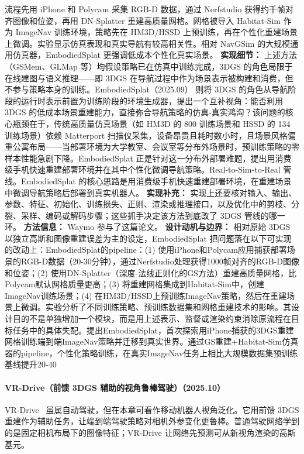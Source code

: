 流程先用 iPhone 和 Polycam 采集 RGB-D 数据，通过 Nerfstudio 获得约千帧对齐图像和位姿，再用 DN-Splatter 重建高质量网格。网格被导入 Habitat-Sim 作为 ImageNav 训练环境，策略先在 HM3D/HSSD 上预训练，再在个性化重建场景上微调。实验显示仿真表现和真实导航有较高相关性。相对 NavGSim 的大规模通用仿真器，EmbodiedSplat 更强调低成本个性化真实场景。
\textbf{实现细节：} 上述方法（GSMem、GLMap 等）均假设策略已在仿真中训练完成，3DGS 的角色局限于在线建图与语义推理——即 3DGS 在导航过程中作为场景表示被构建和消费，但不参与策略本身的训练。EmbodiedSplat（2025.09） 则将 3DGS 的角色从导航阶段的运行时表示前置为训练阶段的环境生成器，提出一个互补视角：能否利用 3DGS 的低成本场景重建能力，直接弥合导航策略的仿真-真实鸿沟？该问题的核心瓶颈在于，传统高质量仿真场景（如 HM3D 的 800 训练场景和 HSSD 的 134 训练场景）依赖 Matterport 扫描仪采集，设备昂贵且耗时数小时，且场景风格偏重公寓布局——当部署环境为大学教室、会议室等分布外场景时，预训练策略的零样本性能急剧下降。EmbodiedSplat 正是针对这一分布外部署难题，提出用消费级手机快速重建部署环境并在其中个性化微调导航策略。Real-to-Sim-to-Real 管线。EmbodiedSplat 的核心思路是用消费级手机快速重建部署环境，在重建场景中微调导航策略后部署到真实机器人。
\textbf{实现补充：} 实现上还要核对输入、输出、参数、特征、初始化、训练损失、正则、渲染或推理接口，以及优化中的剪枝、分裂、采样、编码或解码步骤；这些抓手决定该方法到底改了 3DGS 管线的哪一环。
\textbf{方法信息：} Waymo 参与了这篇论文。
\textbf{设计动机与边界：} 相对原始 3DGS 以独立高斯和图像重建误差为主的设定，EmbodiedSplat 把问题落在以下可实现的改动上：EmbodiedSplat的pipeline：(1) 使用iPhone和Polycam应用捕获部署场景的RGB-D数据（20-30分钟），通过Nerfstudio处理获得1000帧对齐的RGB-D图像和位姿；(2) 使用DN-Splatter（深度-法线正则化的GS方法）重建高质量网格，比Polycam默认网格质量更高；(3) 将重建网格集成到Habitat-Sim中，创建ImageNav训练场景；(4) 在HM3D/HSSD上预训练ImageNav策略，然后在重建场景上微调。实验分析了不同训练策略、预训练数据集和网格重建技术的影响。其设计目的不是单独增加一个模块，而是用上述表示、监督或渲染约束消除原流程在目标任务中的具体失配。提出EmbodiedSplat，首次探索用iPhone捕获的3DGS重建网格训练端到端ImageNav策略并迁移到真实世界。通过GS重建+Habitat-Sim仿真器的pipeline，个性化策略训练，在真实ImageNav任务上相比大规模数据集预训练基线提升20-40%
\paragraph{VR-Drive（前馈 3DGS 辅助的视角鲁棒驾驶）（2025.10）}
VR-Drive~\cite{2510_23205} 虽属自动驾驶，但在本章可看作移动机器人视角泛化。它用前馈 3DGS 重建作为辅助任务，让端到端驾驶策略对相机外参变化更鲁棒。普通驾驶网络学到的是固定相机布局下的图像特征；VR-Drive 让网络先预测可从新视角渲染的高斯基元。

